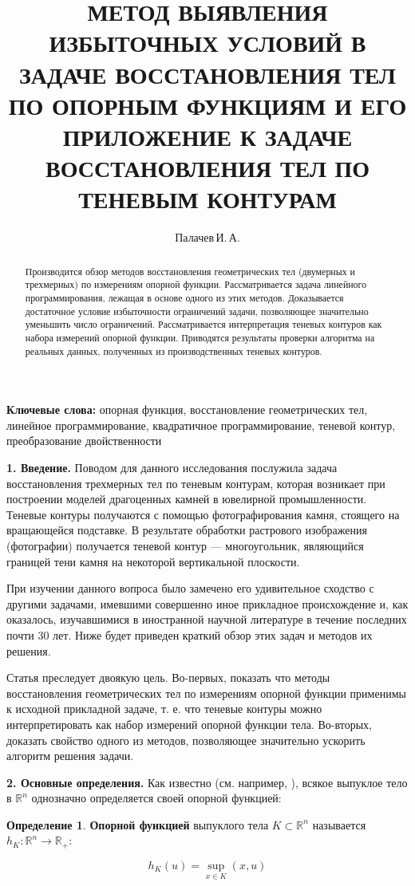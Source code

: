 \documentclass[a4paper, 10pt]{article}
\title{МЕТОД ВЫЯВЛЕНИЯ ИЗБЫТОЧНЫХ УСЛОВИЙ В ЗАДАЧЕ ВОССТАНОВЛЕНИЯ ТЕЛ ПО ОПОРНЫМ
ФУНКЦИЯМ И ЕГО ПРИЛОЖЕНИЕ К ЗАДАЧЕ ВОССТАНОВЛЕНИЯ ТЕЛ ПО ТЕНЕВЫМ КОНТУРАМ}
\author{Палачев\,И.\,А.}
\theoremstyle{definition}
\newtheorem{SmartDefinition}{Определение}
\theoremstyle{plain}
\theoremstyle{plain}
\begin{document}
\maketitle
\begin{abstract}
 Производится обзор методов восстановления геометрических тел (двумерных и
 трехмерных) по измерениям опорной функции. Рассматривается задача линейного
 программирования, лежащая в основе одного из этих методов. Доказывается
 достаточное условие избыточности ограничений задачи, позволяющее значительно
 уменьшить число ограничений. Рассматривается интерпретация теневых контуров
 как набора измерений опорной функции. Приводятся результаты проверки
 алгоритма на реальных данных, полученных из производственных теневых контуров.
\end{abstract}

\textbf{Ключевые слова:} опорная функция, восстановление геометрических тел,
линейное программирование, квадратичное программирование, теневой контур,
преобразование двойственности

\textbf{1. Введение.} Поводом для данного исследования послужила задача
восстановления трехмерных тел по теневым контурам, которая возникает при
построении моделей драгоценных камней в ювелирной промышленности. Теневые
контуры получаются с помощью фотографирования камня, стоящего на вращающейся
подставке. В результате обработки растрового изображения (фотографии) получается
теневой контур --- многоугольник, являющийся границей тени камня на некоторой
вертикальной плоскости.

При изучении данного вопроса было замечено его удивительное сходство с другими
задачами, имевшими совершенно иное прикладное происхождение и, как оказалось,
изучавшимися в иностранной научной литературе в течение последних почти 30 лет.
Ниже будет приведен краткий обзор этих задач и методов их решения.

Статья преследует двоякую цель. Во-первых, показать что методы
восстановления геометрических тел по измерениям опорной функции применимы к
исходной прикладной задаче, т. е. что теневые контуры можно интерпретировать
как набор измерений опорной функции тела. Во-вторых, доказать свойство
одного из методов, позволяющее значительно ускорить алгоритм решения задачи.

\textbf{2. Основные определения.} Как известно (см. например,
\cite{Ghosh:1998:SFR:307150.307167}), всякое выпуклое тело в $\mathbb{R}^{n}$
однозначно определяется своей опорной функцией:

\begin{SmartDefinition}
 \label{def:support-function}
 \textbf{Опорной функцией} выпуклого тела $K \subset \mathbb{R}^{n}$
 называется
 $h_{K}: \mathbb{R}^{n} \to \mathbb{R}_{+}$:

 \begin{equation}h_{K}(u) = \sup \limits_{x \in K}(x, u)\end{equation}
\end{SmartDefinition}
\end{document}
